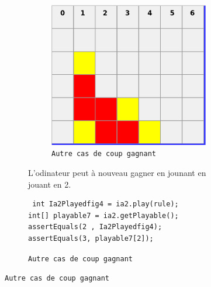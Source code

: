 \begin{figure}[H]
\begin{figure}[H]
\begin{figure}[H]
\begin{center}
  \includegraphics[scale=0.2]{playable3}
  \caption{\texttt{Autre cas de coup gagnant}}
\end{center}
\end{figure}
L'odinateur peut à nouveau gagner en jounant en jouant en 2.

\begin{verbatim}
 int Ia2Playedfig4 = ia2.play(rule);
int[] playable7 = ia2.getPlayable();
assertEquals(2 , Ia2Playedfig4);
assertEquals(3, playable7[2]);
\end{verbatim}



\end{figure}
\end{figure}
